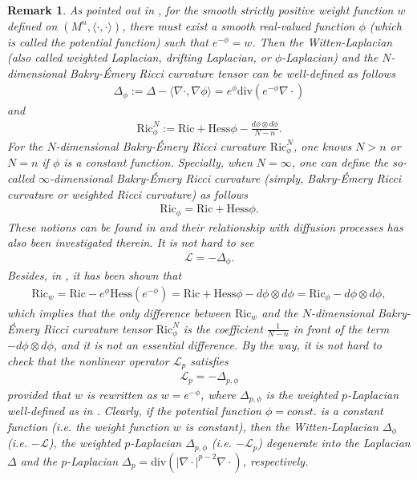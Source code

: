 \documentclass[12pt]{article}
\newtheorem{remark}[theorem]{Remark}
\begin{document}
\begin{remark}  \label{remark1-1}
\rm{ As pointed out in \cite[Remark 1.22]{JM-1}, for the smooth
strictly positive weight function $w$ defined on $(M^{n},
\langle\cdot,\cdot\rangle)$, there must exist a smooth real-valued
function $\phi$ (which is called the \emph{potential function}) such
that $e^{-\phi}=w$. Then the Witten-Laplacian (also called weighted
Laplacian, drifting Laplacian, or $\phi$-Laplacian) and the
$N$-dimensional Bakry-\'{E}mery Ricci curvature tensor can be
well-defined as follows
\begin{eqnarray*}
\Delta_{\phi}:=\Delta-\langle\nabla\cdot,\nabla\phi\rangle=e^{\phi}\mathrm{div}(e^{-\phi}\nabla\cdot)
\end{eqnarray*}
and
\begin{eqnarray*}
\mathrm{Ric}^{N}_{\phi}:=\mathrm{Ric}+\mathrm{Hess}\phi-\frac{d\phi\otimes
d\phi}{N-n}.
\end{eqnarray*}
For the $N$-dimensional Bakry-\'{E}mery Ricci curvature
$\mathrm{Ric}^{N}_{\phi}$, one knows $N>n$ or $N=n$ if $\phi$ is a
constant function. Specially, when $N=\infty$, one can define the
so-called $\infty$-dimensional Bakry-\'{E}mery Ricci curvature
(simply, Bakry-\'{E}mery Ricci curvature or weighted Ricci
curvature) as follows
 \begin{eqnarray*}
 \mathrm{Ric}_{\phi}=\mathrm{Ric}+\mathrm{Hess}\phi.
 \end{eqnarray*}
These notions can be found in \cite{BE} and their relationship with
diffusion processes has also been investigated therein. It is not
hard to see
 \begin{eqnarray*}
\mathcal{L}=-\Delta_{\phi}.
 \end{eqnarray*}
Besides, in \cite[Remark 1.22]{JM-1}, it has been shown that
\begin{eqnarray*}
 \mathrm{Ric}_{w}=\mathrm{Ric}-e^{\phi}\mathrm{Hess}(e^{-\phi})=\mathrm{Ric}+\mathrm{Hess}\phi-d\phi\otimes
d\phi=
 \mathrm{Ric}_{\phi}-d\phi\otimes
d\phi,
 \end{eqnarray*}
which implies that the only difference between $\mathrm{Ric}_{w}$
and the $N$-dimensional Bakry-\'{E}mery Ricci curvature tensor
$\mathrm{Ric}_{\phi}^{N}$ is the coefficient $\frac{1}{N-n}$ in
front of the term $-d\phi\otimes d\phi$, and it is not an essential
difference. By the way, it is not hard to check that the nonlinear
operator $\mathcal{L}_{p}$ satisfies
 \begin{eqnarray*}
\mathcal{L}_{p}=-\Delta_{p,\phi}
 \end{eqnarray*}
provided that $w$ is rewritten as $w=e^{-\phi}$, where
$\Delta_{p,\phi}$ is the weighted $p$-Laplacian well-defined as in
\cite[Section 2]{JM-1}. Clearly, if the potential function
$\phi=const.$ is a constant function (i.e. the weight function $w$
is constant), then the Witten-Laplacian $\Delta_{\phi}$ (i.e.
$-\mathcal{L}$), the weighted $p$-Laplacian $\Delta_{p,\phi}$ (i.e.
$-\mathcal{L}_{p}$) degenerate into the Laplacian $\Delta$ and the
$p$-Laplacian
$\Delta_{p}=\mathrm{div}(|\nabla\cdot|^{p-2}\nabla\cdot)$,
respectively. }
\end{remark}
\end{document}
